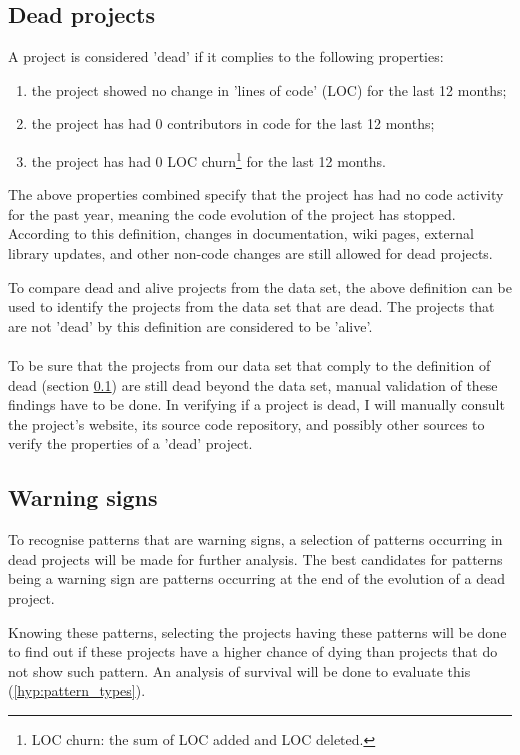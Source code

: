 \subsection{Dead projects}
\label{def:dead}
A project is considered 'dead' if it complies to the following properties:
\begin{enumerate}
	\item the project showed no change in 'lines of code' (LOC) for the last 12
	months;
	\item the project has had 0 contributors in code for the last 12 months;
	\item the project has had 0 LOC churn\footnote{LOC churn: the sum of LOC added
	and LOC deleted.} for the last 12 months.
\end{enumerate}

\noindent
The above properties combined specify that the project has had no code activity
for the past year, meaning the code evolution of the project has stopped.
According to this definition, changes in documentation, wiki pages, external
library updates, and other non-code changes are still allowed for dead
projects.

To compare dead and alive projects from the data set, the above definition can
be used to identify the projects from the data set that are dead. The projects
that are not 'dead' by this definition are considered to be 'alive'.

\paragraph{}
To be sure that the projects from our data set that comply to the definition of
dead (section \ref{def:dead}) are still dead beyond the data set, manual
validation of these findings have to be done. In verifying if a project is
dead, I will manually consult the project's website, its source code
repository, and possibly other sources to verify the properties of a 'dead'
project.

\subsection{Warning signs}
To recognise patterns that are warning signs, a selection of patterns occurring
in dead projects will be made for further analysis. The best candidates for
patterns being a warning sign are patterns occurring at the end of the
evolution of a dead project.

Knowing these patterns, selecting the projects having these patterns will be
done to find out if these projects have a higher chance of dying than projects
that do not show such pattern. An analysis of survival will be done to evaluate
this (\ref{hyp:pattern_types}).

